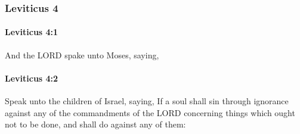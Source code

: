 	\subsubsection{Leviticus 4} %
		\label{LEVITICUS-4}

		\paragraph{Leviticus 4:1} %
			\label{LEVITICUS-4-1}

			And the LORD spake unto Moses, saying,


		\paragraph{Leviticus 4:2} %
			\label{LEVITICUS-4-2}

			Speak unto the children of Israel, saying, If a soul shall sin through ignorance against any of the commandments of the LORD concerning things which ought not to be done, and shall do against any of them:

